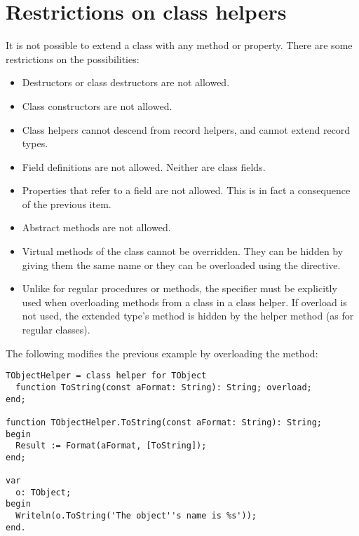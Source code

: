 \section{Restrictions on class helpers}
It is not possible to extend a class with any method or property. There are
some restrictions on the possibilities:
\begin{itemize}
\item Destructors or class destructors are not allowed.
\item Class constructors are not allowed. 
\item Class helpers cannot descend from record helpers, and cannot extend record types.
\item Field definitions are not allowed. Neither are class fields.
\item Properties that refer to a field are not allowed. This is in fact a
consequence of the previous item.
\item Abstract methods are not allowed.
\item Virtual methods of the class cannot be overridden. They can be hidden
by giving them the same name or they can be overloaded using the
 directive.
\item Unlike for regular procedures or methods, the  specifier must 
be explicitly used when overloading methods from a class in a class helper. 
If overload is not used, the extended type's method is hidden by the helper method
(as for regular classes).
\end{itemize}
The following modifies the previous example by overloading the 
method:
\begin{verbatim}
TObjectHelper = class helper for TObject
  function ToString(const aFormat: String): String; overload;
end;
 
function TObjectHelper.ToString(const aFormat: String): String;
begin
  Result := Format(aFormat, [ToString]);
end;
 
var
  o: TObject;
begin
  Writeln(o.ToString('The object''s name is %s'));
end.
\end{verbatim}

